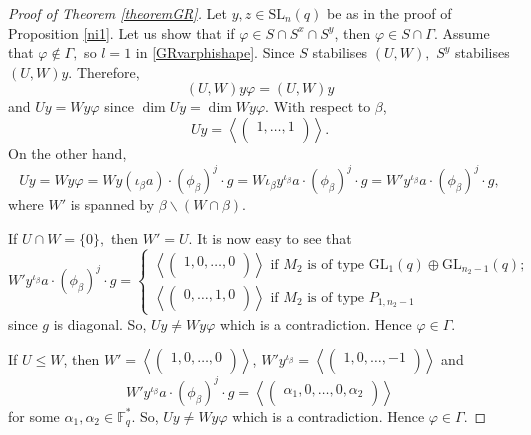 \documentclass[a4paper,reqno,11pt]{amsart}
\theoremstyle{definition}
\theoremstyle{remark}
\numberwithin{equation}{section}
\newcommand{\SL}{{\mathrm{SL}}}
\newcommand{\GL}{{\mathrm{GL}}}
\begin{document}
\begin{proof}[Proof of Theorem {\rm \ref{theoremGR}}]
 Let $y ,z \in \SL_n(q)$ be as in the proof of Proposition \ref{ni1}. Let us show that if $\varphi \in S \cap S^x \cap S^y$, then $\varphi \in S \cap \Gamma.$ Assume that $\varphi \notin \Gamma,$ so $l=1$ in  \eqref{GRvarphishape}.  Since $S$ stabilises $(U,W),$ $S^y$ stabilises $(U,W)y$. Therefore, $$(U,W)y \varphi =(U,W)y$$
and $Uy=Wy\varphi$ since $\dim Uy= \dim Wy\varphi.$ With respect to $\beta$,
$$Uy= \left \langle 
\begin{pmatrix}
1, \ldots, 1 \\
\end{pmatrix}
\right \rangle.$$ On the other hand, 
$$Uy=Wy \varphi =W y (\iota_{\beta} a) \cdot (\phi_{\beta})^j \cdot g =W \iota_{\beta} y^{\iota_{\beta}}a\cdot (\phi_{\beta})^j \cdot g= W'y^{\iota_{\beta}}a\cdot (\phi_{\beta})^j \cdot g,$$
where $W'$ is spanned by $\beta \backslash (W \cap \beta).$ 

 If $U \cap W = \{0\},$ then $W'=U.$ It is now easy to see that 
$$W'y^{\iota_{\beta}}a\cdot (\phi_{\beta})^j \cdot g = 
\begin{cases} \left \langle 
\begin{pmatrix}
1,0, \ldots, 0 \\
\end{pmatrix}
\right \rangle \text{ if } M_2 \text{ is of type } \GL_1(q) \oplus \GL_{n_2-1}(q); \\
\left \langle 
\begin{pmatrix}
0, \ldots,1, 0 \\
\end{pmatrix}
\right \rangle \text{ if } M_2 \text{ is of type } P_{1, n_2-1}
\end{cases} $$
since $g$ is diagonal. So, $Uy \ne Wy \varphi$ which is a contradiction. Hence $\varphi \in \Gamma.$

If $U\le W$, then $W'= \left \langle 
\begin{pmatrix}
1, 0, \ldots, 0 \\
\end{pmatrix}
\right \rangle$, $W'y^{\iota_{\beta}}= \left \langle 
\begin{pmatrix}
1, 0, \ldots, -1 \\
\end{pmatrix}
\right \rangle$ and  $$W'y^{\iota_{\beta}}a\cdot (\phi_{\beta})^j \cdot g=\left \langle 
\begin{pmatrix}
\alpha_1, 0, \ldots,0, \alpha_2 \\
\end{pmatrix}
\right \rangle$$ for some $\alpha_1, \alpha_2 \in \mathbb{F}_q^*.$ So, $Uy \ne Wy \varphi$ which is a contradiction. Hence $\varphi \in \Gamma.$


\end{proof}
\end{document}
